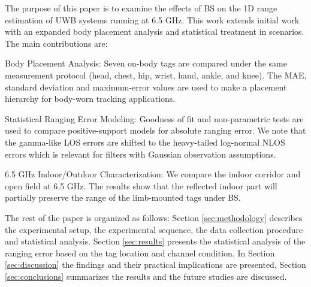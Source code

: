 The purpose of this paper is to examine the effects of BS on the 1D range estimation of UWB systems running at 6.5 GHz. This work extends initial work \cite{danny_daniel_and_victor_quintero} with an expanded body placement analysis and statistical treatment in scenarios. The main contributions are:

Body Placement Analysis: Seven on-body tags are compared under the same measurement protocol (head, chest, hip, wrist, hand, ankle, and knee). The MAE, standard deviation and maximum-error values are used to make a placement hierarchy for body-worn tracking applications.

Statistical Ranging Error Modeling: Goodness of fit and non-parametric tests are used to compare positive-support models for absolute ranging error. We note that the gamma-like LOS errors are shifted to the heavy-tailed log-normal NLOS errors which is relevant for filters with Gaussian observation assumptions.


6.5 GHz Indoor/Outdoor Characterization: We compare the indoor corridor and open field at 6.5 GHz. The results show that the reflected indoor part will partially preserve the range of the limb-mounted tags under BS.

The rest of the paper is organized as follows: Section \ref{sec:methodology} describes the experimental setup, the experimental sequence, the data collection procedure and statistical analysis. Section \ref{sec:results} presents the statistical analysis of the ranging error based on the tag location and channel condition. In Section \ref{sec:discussion} the findings and their practical implications are presented, Section \ref{sec:conclusions} summarizes the results and the future studies are discussed.
